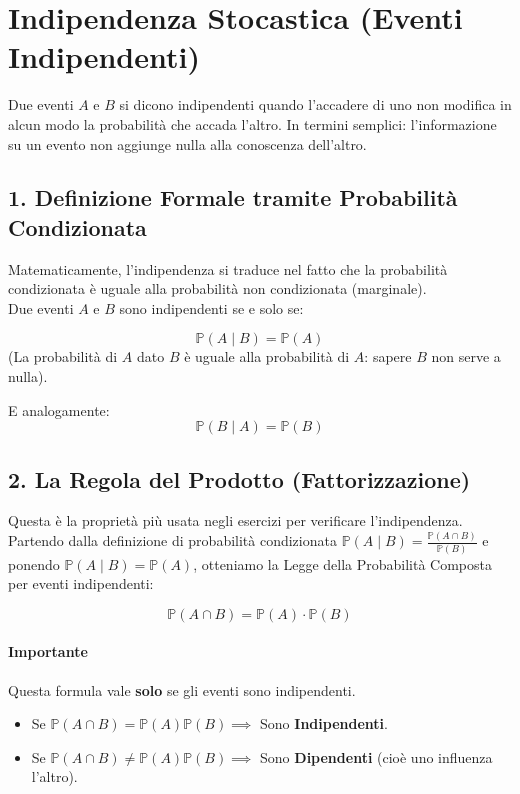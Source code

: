 \section{Indipendenza Stocastica (Eventi Indipendenti)}

Due eventi $A$ e $B$ si dicono indipendenti quando l'accadere di uno non modifica in alcun modo la probabilità che accada l'altro. In termini semplici: l'informazione su un evento non aggiunge nulla alla conoscenza dell'altro.

\subsection{1. Definizione Formale tramite Probabilità Condizionata}

Matematicamente, l'indipendenza si traduce nel fatto che la probabilità condizionata è uguale alla probabilità non condizionata (marginale).
\\Due eventi $A$ e $B$ sono indipendenti se e solo se:

\[
\mathbb{P}(A \mid B) = \mathbb{P}(A)
\]
(La probabilità di $A$ dato $B$ è uguale alla probabilità di $A$: sapere $B$ non serve a nulla).

E analogamente:
\[
\mathbb{P}(B \mid A) = \mathbb{P}(B)
\]

\subsection{2. La Regola del Prodotto (Fattorizzazione)}

Questa è la proprietà più usata negli esercizi per verificare l'indipendenza.
\\Partendo dalla definizione di probabilità condizionata $\mathbb{P}(A \mid B) = \frac{\mathbb{P}(A \cap B)}{\mathbb{P}(B)}$ e ponendo $\mathbb{P}(A \mid B) = \mathbb{P}(A)$, otteniamo la Legge della Probabilità Composta per eventi indipendenti:

\begin{equation}
\boxed{\mathbb{P}(A \cap B) = \mathbb{P}(A) \cdot \mathbb{P}(B)}
\end{equation}

\paragraph{Importante}
Questa formula vale \textbf{solo} se gli eventi sono indipendenti.
\begin{itemize}
    \item Se $\mathbb{P}(A \cap B) = \mathbb{P}(A)\mathbb{P}(B) \implies$ Sono \textbf{Indipendenti}.
    \item Se $\mathbb{P}(A \cap B) \neq \mathbb{P}(A)\mathbb{P}(B) \implies$ Sono \textbf{Dipendenti} (cioè uno influenza l'altro).
\end{itemize}

